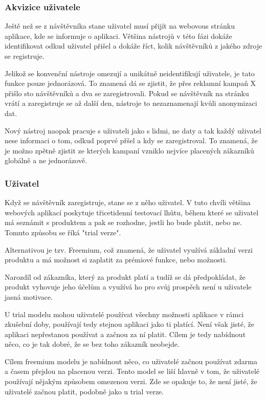 \documentclass[bc,male,java,dept456]{diploma}						%
\begin{document}
\subsubsection{Akvizice uživatele}

Ještě než se z návštěvníka stane uživatel musí přijít na webovous stránku aplikace, kde se informuje o aplikaci. Většina nástrojů v této fázi dokáže identifikovat odkud uživatel přišel a dokáže říct, kolik návštěvníků z jakého zdroje se registruje.

Jelikož se konvenční nástroje omezují a unikátně neidentifikují uživatele, je tato funkce pouze jednorázová. To znamená dá se zjistit, že přes reklamní kampaň X přišlo sto ná\-vště\-vní\-ků a dva se zaregistrovali. Pokud se návštěvník na stránku vrátí a zaregistruje se až další den, nástroje to nezaznamenají kvůli anonymizaci dat.

Nový nástroj naopak pracuje s uživateli jako s lidmi, ne daty a tak každý uživatel nese informaci o tom, odkud poprvé přšel a kdy se zaregistroval. To znamená, že je možno zpětně zjistit ze kterých kampaní vzniklo nejvíce placených zákazníků globálně a ne jednorázově.

\subsubsection{Uživatel}

Když se návštěvník zaregistruje, stane se z něho uživatel. V tuto chvíli většina webových aplikací poskytuje třicetidenní testovací lhůtu, během které se uživatel má seznámit s produktem a pak se rozhodne, jestli ho bude platit, nebo ne. Tomuto způsobu se říká "trial verze".

Alternativou je tzv. Freemium, což znamená, že uživatel využívá základní verzi produktu a má možnost si zaplatit za prémiové funkce, nebo možnosti.

Narozdíl od zákazníka, který za produkt platí a tudíž se dá předpokládat, že produkt vyhovuje jeho účelům a využívá ho pro svůj prospěch není u uživatele jasná motivace. 

U trial modelu mohou uživatelé používat všechny možnosti aplikace v rámci zkušební doby, používají tedy stejnou aplikaci jako ti platící. Není však jisté, že aplikaci nepřestanou používat a začnou za ní platit. Cílem je tedy nabídnout něco, co je tak dobré, že se bez toho zákazník neobejde.

Cílem freemium modelu je nabídnout něco, co uživatelé začnou používat zdarma a časem přejdou na placenou verzi. Tento model se liší hlavně v tom, že uživatelé používají nějakým způsobem omezenou verzi. Zde se opakuje to, že není jisté, že uživatelé začnou platit, podobně jako u trial verze.
\end{document}
